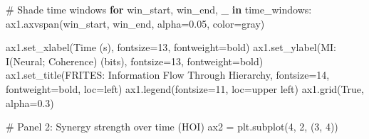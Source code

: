 \documentclass[
  11pt,
  letterpaper,
  oneside,
  openany]{book}
\newenvironment{Shaded}{\begin{snugshade}}{\end{snugshade}}
\newcommand{\CommentTok}[1]{\textcolor[rgb]{0.37,0.37,0.37}{#1}}
\newcommand{\ControlFlowTok}[1]{\textcolor[rgb]{0.00,0.23,0.31}{\textbf{#1}}}
\newcommand{\DecValTok}[1]{\textcolor[rgb]{0.68,0.00,0.00}{#1}}
\newcommand{\FloatTok}[1]{\textcolor[rgb]{0.68,0.00,0.00}{#1}}
\newcommand{\KeywordTok}[1]{\textcolor[rgb]{0.00,0.23,0.31}{\textbf{#1}}}
\newcommand{\NormalTok}[1]{\textcolor[rgb]{0.00,0.23,0.31}{#1}}
\newcommand{\OperatorTok}[1]{\textcolor[rgb]{0.37,0.37,0.37}{#1}}
\newcommand{\StringTok}[1]{\textcolor[rgb]{0.13,0.47,0.30}{#1}}
\newcommand{\VariableTok}[1]{\textcolor[rgb]{0.07,0.07,0.07}{#1}}
\begin{document}
\begin{Shaded}
\begin{Highlighting}[]
\CommentTok{\# Shade time windows}
\ControlFlowTok{for}\NormalTok{ win\_start, win\_end, \_ }\KeywordTok{in}\NormalTok{ time\_windows:}
\NormalTok{    ax1.axvspan(win\_start, win\_end, alpha}\OperatorTok{=}\FloatTok{0.05}\NormalTok{, color}\OperatorTok{=}\StringTok{\textquotesingle{}gray\textquotesingle{}}\NormalTok{)}

\NormalTok{ax1.set\_xlabel(}\StringTok{\textquotesingle{}Time (s)\textquotesingle{}}\NormalTok{, fontsize}\OperatorTok{=}\DecValTok{13}\NormalTok{, fontweight}\OperatorTok{=}\StringTok{\textquotesingle{}bold\textquotesingle{}}\NormalTok{)}
\NormalTok{ax1.set\_ylabel(}\StringTok{\textquotesingle{}MI: I(Neural; Coherence) (bits)\textquotesingle{}}\NormalTok{, fontsize}\OperatorTok{=}\DecValTok{13}\NormalTok{, fontweight}\OperatorTok{=}\StringTok{\textquotesingle{}bold\textquotesingle{}}\NormalTok{)}
\NormalTok{ax1.set\_title(}\StringTok{\textquotesingle{}FRITES: Information Flow Through Hierarchy\textquotesingle{}}\NormalTok{, }
\NormalTok{             fontsize}\OperatorTok{=}\DecValTok{14}\NormalTok{, fontweight}\OperatorTok{=}\StringTok{\textquotesingle{}bold\textquotesingle{}}\NormalTok{, loc}\OperatorTok{=}\StringTok{\textquotesingle{}left\textquotesingle{}}\NormalTok{)}
\NormalTok{ax1.legend(fontsize}\OperatorTok{=}\DecValTok{11}\NormalTok{, loc}\OperatorTok{=}\StringTok{\textquotesingle{}upper left\textquotesingle{}}\NormalTok{)}
\NormalTok{ax1.grid(}\VariableTok{True}\NormalTok{, alpha}\OperatorTok{=}\FloatTok{0.3}\NormalTok{)}

\CommentTok{\# Panel 2: Synergy strength over time (HOI)}
\NormalTok{ax2 }\OperatorTok{=}\NormalTok{ plt.subplot(}\DecValTok{4}\NormalTok{, }\DecValTok{2}\NormalTok{, (}\DecValTok{3}\NormalTok{, }\DecValTok{4}\NormalTok{))}


\end{Highlighting}
\end{Shaded}
\end{document}
